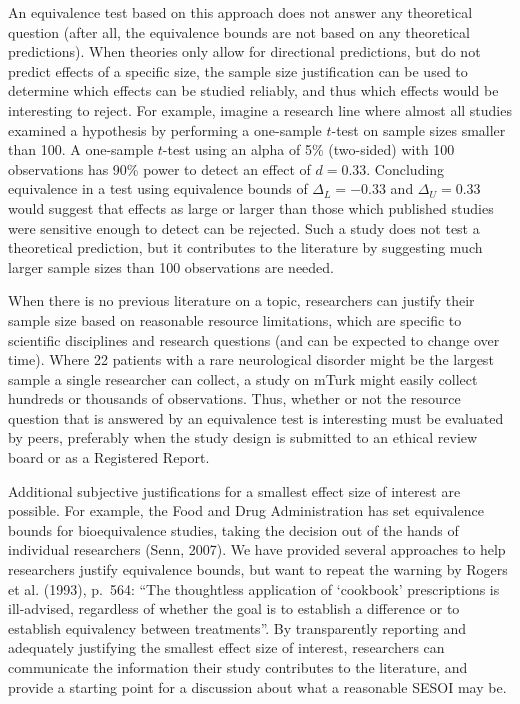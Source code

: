 \documentclass[english,floatsintext,man]{apa6}
\theoremstyle{definition}
\theoremstyle{definition}
\theoremstyle{definition}
\theoremstyle{remark}
\begin{document}
An equivalence test based on this approach does not answer any
theoretical question (after all, the equivalence bounds are not based on
any theoretical predictions). When theories only allow for directional
predictions, but do not predict effects of a specific size, the sample
size justification can be used to determine which effects can be studied
reliably, and thus which effects would be interesting to reject. For
example, imagine a research line where almost all studies examined a
hypothesis by performing a one-sample \(t\)-test on sample sizes smaller
than 100. A one-sample \(t\)-test using an alpha of 5\% (two-sided) with
100 observations has 90\% power to detect an effect of \(d = 0.33\).
Concluding equivalence in a test using equivalence bounds of
\(\Delta_{L} = -0.33\) and \(\Delta_{U} = 0.33\) would suggest that
effects as large or larger than those which published studies were
sensitive enough to detect can be rejected. Such a study does not test a
theoretical prediction, but it contributes to the literature by
suggesting much larger sample sizes than 100 observations are needed.

When there is no previous literature on a topic, researchers can justify
their sample size based on reasonable resource limitations, which are
specific to scientific disciplines and research questions (and can be
expected to change over time). Where 22 patients with a rare
neurological disorder might be the largest sample a single researcher
can collect, a study on mTurk might easily collect hundreds or thousands
of observations. Thus, whether or not the resource question that is
answered by an equivalence test is interesting must be evaluated by
peers, preferably when the study design is submitted to an ethical
review board or as a Registered Report.

Additional subjective justifications for a smallest effect size of
interest are possible. For example, the Food and Drug Administration has
set equivalence bounds for bioequivalence studies, taking the decision
out of the hands of individual researchers (Senn, 2007). We have
provided several approaches to help researchers justify equivalence
bounds, but want to repeat the warning by Rogers et al. (1993), p.~564:
\enquote{The thoughtless application of \enquote{cookbook} prescriptions
is ill-advised, regardless of whether the goal is to establish a
difference or to establish equivalency between treatments}. By
transparently reporting and adequately justifying the smallest effect
size of interest, researchers can communicate the information their
study contributes to the literature, and provide a starting point for a
discussion about what a reasonable SESOI may be.
\end{document}
